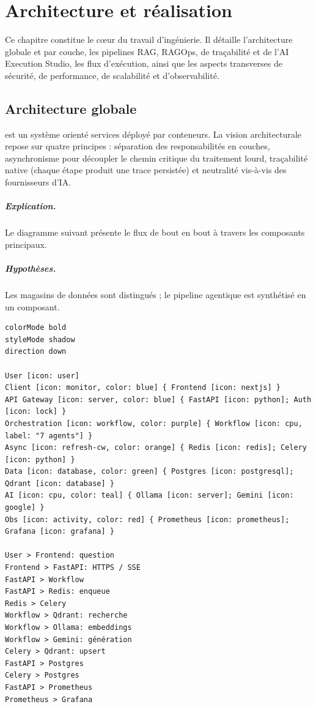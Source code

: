 \chapter{Architecture et réalisation}
\label{chap:archi}

Ce chapitre constitue le c{\oe}ur du travail d'ingénierie. Il détaille
l'architecture globale et par couche, les pipelines RAG, RAGOps, de traçabilité
et de l'AI Execution Studio, les flux d'exécution, ainsi que les aspects
transverses de sécurité, de performance, de scalabilité et d'observabilité.

\section{Architecture globale}
\devpilot{} est un système orienté services déployé par conteneurs. La vision
architecturale repose sur quatre principes : séparation des responsabilités en
couches, asynchronisme pour découpler le chemin critique du traitement lourd,
traçabilité native (chaque étape produit une trace persistée) et neutralité
vis-à-vis des fournisseurs d'IA.

\paragraph{Explication.} Le diagramme suivant présente le flux de bout en bout à
travers les composants principaux.
\paragraph{Hypothèses.} Les magasins de données sont distingués ; le pipeline
agentique est synthétisé en un composant.

\begin{lstlisting}[style=eraser,caption={Architecture globale et flux de données (Eraser)},label={lst:global}]
colorMode bold
styleMode shadow
direction down

User [icon: user]
Client [icon: monitor, color: blue] { Frontend [icon: nextjs] }
API Gateway [icon: server, color: blue] { FastAPI [icon: python]; Auth [icon: lock] }
Orchestration [icon: workflow, color: purple] { Workflow [icon: cpu, label: "7 agents"] }
Async [icon: refresh-cw, color: orange] { Redis [icon: redis]; Celery [icon: python] }
Data [icon: database, color: green] { Postgres [icon: postgresql]; Qdrant [icon: database] }
AI [icon: cpu, color: teal] { Ollama [icon: server]; Gemini [icon: google] }
Obs [icon: activity, color: red] { Prometheus [icon: prometheus]; Grafana [icon: grafana] }

User > Frontend: question
Frontend > FastAPI: HTTPS / SSE
FastAPI > Workflow
FastAPI > Redis: enqueue
Redis > Celery
Workflow > Qdrant: recherche
Workflow > Ollama: embeddings
Workflow > Gemini: génération
Celery > Qdrant: upsert
FastAPI > Postgres
Celery > Postgres
FastAPI > Prometheus
Prometheus > Grafana
\end{lstlisting}


